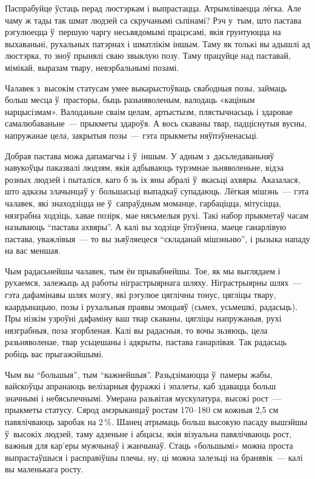 Паспрабуйце ўстаць перад люстэркам і выпрастацца. Атрымліваецца лёгка. Але чаму ж тады так шмат людзей са скручанымі сьпінамі? Рэч у~тым, што пастава рэгулюецца ў~першую чаргу несьвядомымі працэсамі, якія грунтуюцца на выхаваньні, рухальных патэрнах і шматлікім іншым. Таму як толькі вы адышлі ад люстэрка, то зноў прынялі сваю звыклую позу. Таму працуйце над паставай, мімікай, выразам твару, невэрбальнымі позамі.

Чалавек з~высокім статусам умее выкарыстоўваць свабодныя позы, займаць больш месца ў~прасторы, быць разьняволеным, валодаць «каціным нарцысізмам». Валоданьне сваім целам, артыстызм, плястычнасьць і здаровае самалюбаваньне~--- прыкметы здароўя. А вось скаваны твар, падціснутыя вусны, напружанае цела, закрытыя позы~--- гэта прыкметы няўпэўненасьці.

Добрая пастава можа дапамагчы і ў~іншым. У адным з~дасьледаваньняў навукоўцы паказвалі людзям, якія адбываюць турэмнае зьняволеньне, відэа розных людзей і пыталіся, каго б зь іх яны абралі ў~якасьці ахвяры. Аказалася, што адказы злачынцаў у~большасьці выпадкаў супадаюць. Лёгкая мішэнь~--- гэта чалавек, які знаходзіцца не ў~сапраўдным моманце, гарбаціцца, мітусіцца, нязграбна ходзіць, хавае позірк, мае нясьмелыя рухі. Такі набор прыкметаў часам называюць ``пастава ахвяры''. А калі вы ходзіце ўпэўнена, маеце ганарлівую пастава, уважлівыя~--- то вы зьяўляецеся ``складанай мішэньню'', і рызыка нападу на вас меншая.

Чым радасьнейшы чалавек, тым ён прывабнейшы. Тое, як мы выглядаем і рухаемся, залежыць ад работы ніграстрыярнага шляху. Ніграстрыярны шлях~--- гэта дафамінавы шлях мозгу, які рэгулюе цяглічны тонус, цягліцы твару, каардынацыю, позы і рухальныя праявы эмоцыяў (сьмех, усьмешкі, радасьць). Пры нізкім узроўні дафаміну ваш твар скаваны, цягліцы напружаныя, рухі нязграбныя, поза згорбленая. Калі вы радасныя, то вочы зьзяюць, цела разьняволенае, твар усьцешаны і адкрыты, пастава ганарлівая. Так радасьць робіць вас прыгажэйшымі.

Чым вы ``большыя'', тым ``важнейшыя''. Разьдзімаюцца ў~памеры жабы, вайскоўцы апранаюць велізарныя фуражкі і эпалеты, каб здавацца больш значнымі і небясьпечнымі. Умерана разьвітая мускулатура, высокі рост~--- прыкметы статусу. Сярод амэрыканцаў ростам 170--180 см кожныя 2,5 см павялічваюць заробак на 2\,\%. Шанец атрымаць больш высокую пасаду вышэйшы ў~высокіх людзей, таму адзеньне і абцасы, якія візуальна павялічваюць рост, важныя для кар'еры мужчынаў і жанчынаў. Стаць «большымі» можна проста выпрастаўшыся і расправіўшы плечы, ну, ці можна залезьці на бранявік~--- калі вы маленькага росту. 

